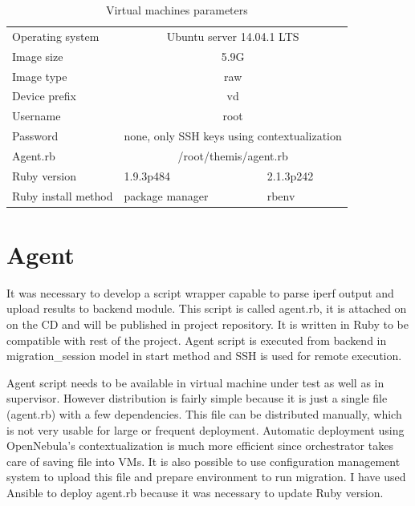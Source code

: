 \begin{table}[htb]
\begin{center}
	\caption{Virtual machines parameters}
	\label{tab:vm-params}
	\begin{tabular}{|l|l|l|}
	\hline
	\Th{Parameter} & \Th{VM for migration} & \Th{Supervisor} \\
	\hline
	Operating system & \multicolumn{2}{c|}{Ubuntu server 14.04.1 LTS} \\
	\hline
	Image size & \multicolumn{2}{c|}{5.9G} \\
	\hline
	Image type & \multicolumn{2}{c|}{raw} \\
	\hline
	Device prefix & \multicolumn{2}{c|}{vd} \\
	\hline
	Username & \multicolumn{2}{c|}{root} \\
	\hline
	Password & \multicolumn{2}{c|}{none, only \Ac{SSH} keys using contextualization}\\
	\hline
	Agent.rb & \multicolumn{2}{c|}{/root/themis/agent.rb}\\
	\hline
	Ruby version & 1.9.3p484 & 2.1.3p242 \\
	\hline
	Ruby install method & package manager & rbenv \\
	\hline
	\end{tabular}
\end{center}
\end{table}


\section{Agent}
It was necessary to develop a script wrapper capable to parse iperf output and upload results to backend module. This script is called agent.rb, it is attached on on the CD and will be published in project repository. It is written in Ruby to be compatible with rest of the project. Agent script is executed from backend in migration\_session model in start method and \Ac{SSH} is used for remote execution.

Agent script needs to be available in virtual machine under test as well as in supervisor. However distribution is fairly simple because it is just a single file (agent.rb) with a few dependencies. This file can be distributed manually, which is not very usable for large or frequent deployment. Automatic deployment using OpenNebula's contextualization is much more efficient since orchestrator takes care of saving file into \Ac{VM}s. 
It is also possible to use configuration management system to upload this file and prepare environment to run migration. I have used Ansible to deploy agent.rb because it was necessary to update Ruby version. 

